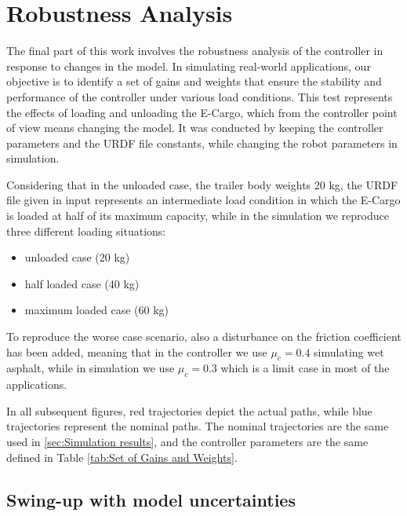 \chapter{Robustness Analysis}
\label{ch:chapter_six}%

The final part of this work involves the robustness analysis of the controller in response to changes in the model. In simulating real-world applications, our objective is to identify a set of gains and weights that ensure the stability and performance of the controller under various load conditions. This test represents the effects of loading and unloading the E-Cargo, which from the controller point of view means changing the model. It was conducted by keeping the controller parameters and the URDF file constants, while changing the robot parameters in simulation.

Considering that in the unloaded case, the trailer body weights 20 kg, the URDF file given in input represents an intermediate load condition in which the E-Cargo is loaded at half of its maximum capacity, while in the simulation we reproduce three different loading situations:

\begin{itemize}
    \item unloaded case (20 kg)
    \item half loaded case (40 kg)
    \item maximum loaded case (60 kg)
\end{itemize}

To reproduce the worse case scenario, also a disturbance on the friction coefficient has been added, meaning that in the controller we use $\mu_c = 0.4$ simulating wet asphalt, while in simulation we use $\mu_c = 0.3$ which is a limit case in most of the applications.

In all subsequent figures, red trajectories depict the actual paths, while blue trajectories represent the nominal paths.
The nominal trajectories are the same used in \cref{sec:Simulation results}, and the controller parameters are the same defined in Table \ref{tab:Set of Gains and Weights}.

\section{Swing-up with model uncertainties}
\label{sec:Swing-up with model uncertainties}

